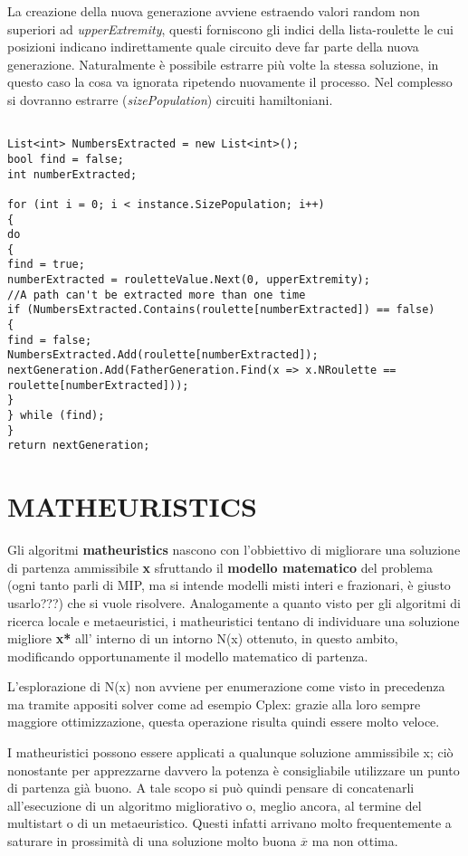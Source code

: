 \documentclass[11pt]{article}
\begin{document}
La creazione della nuova generazione avviene estraendo valori random non superiori ad \textit{upperExtremity}, questi forniscono gli indici della lista-roulette le cui posizioni indicano indirettamente quale circuito deve far parte della nuova generazione. Naturalmente è possibile estrarre più volte la stessa soluzione, in questo caso la cosa va ignorata ripetendo nuovamente il processo. Nel complesso si dovranno estrarre (\textit{sizePopulation}) circuiti hamiltoniani.

\begin{lstlisting}

List<int> NumbersExtracted = new List<int>();
bool find = false;
int numberExtracted;

for (int i = 0; i < instance.SizePopulation; i++)
{
do
{
find = true;
numberExtracted = rouletteValue.Next(0, upperExtremity);
//A path can't be extracted more than one time
if (NumbersExtracted.Contains(roulette[numberExtracted]) == false)
{
find = false;
NumbersExtracted.Add(roulette[numberExtracted]);
nextGeneration.Add(FatherGeneration.Find(x => x.NRoulette == roulette[numberExtracted]));
}
} while (find);
}
return nextGeneration;

\end{lstlisting}

\section*{MATHEURISTICS}

Gli algoritmi \textbf{matheuristics} nascono con l'obbiettivo di migliorare una soluzione di partenza ammissibile \textbf{x} sfruttando il \textbf{modello matematico} del problema (ogni tanto parli di MIP, ma si intende modelli misti interi e frazionari, è giusto usarlo???) che si vuole risolvere. Analogamente a quanto visto per gli algoritmi di ricerca locale e metaeuristici, i matheuristici tentano di individuare una soluzione migliore \textbf{x*} all' interno di un intorno N(x) ottenuto, in questo ambito, modificando opportunamente il modello matematico di partenza. 

L'esplorazione di N(x) non avviene per enumerazione come visto in precedenza ma tramite appositi solver come ad esempio Cplex: grazie alla loro sempre maggiore ottimizzazione, questa operazione risulta quindi essere molto veloce. 

I matheuristici possono essere applicati a qualunque soluzione ammissibile x; ciò nonostante per apprezzarne davvero la potenza è consigliabile utilizzare un punto di partenza già buono. A tale scopo si può quindi pensare di concatenarli  all'esecuzione di un algoritmo migliorativo o, meglio ancora, al termine del multistart o di un metaeuristico. Questi infatti arrivano molto frequentemente a saturare in prossimità di una soluzione molto buona \textbf{$\overline{x}$} ma non ottima.
\end{document}
